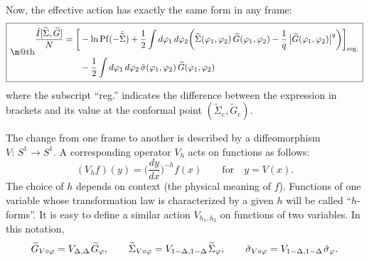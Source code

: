\documentclass[12pt]{article}
\makeatletter
\newcommand*{\wideboxed}[1]{\setlength{\fboxsep}{1ex}%
  \fbox{\m@th$\displaystyle#1$}}
\DeclareMathOperator{\Pf}{Pf}
\newcommand{\cc}{\mathrm{c}}
\newcommand{\tI}{\tilde{I}}
\newcommand{\tG}{\widetilde{G}}
\newcommand{\tSig}{\widetilde{\Sigma}}
\newcommand{\tsig}{\tilde{\sigma}}
\newcommand{\vp}{\varphi}
\makeatother
\begin{document}
Now, the effective action has exactly the same form in any frame:
\begin{equation}\label{rdact1}
\wideboxed{\begin{aligned}
\frac{\tI[\tSig,\tG]}{N}
=\biggl[&-\ln\Pf(-\hat{\tSig})
+\frac{1}{2}\int d\vp_1\,d\vp_2
\biggl(\tSig(\vp_1,\vp_2)\,\tG(\vp_1,\vp_2)
-\frac{1}{q}\,\bigl|\tG(\vp_1,\vp_2)\bigr|^q\biggr)\biggr]_{\text{reg.}}
\\[3pt]
&-\frac{1}{2}\int d\vp_1\,d\vp_2\,
\tsig(\vp_1,\vp_2)\,\tG(\vp_1,\vp_2)
\end{aligned}}
\end{equation}
where the subscript ``reg.'' indicates the difference between the expression in brackets and its value at the conformal point $(\tSig_{\cc},\tG_{\cc})$.

The change from one frame to another is described by a diffeomorphism $V:\,S^1\to S^1$. A corresponding operator $V_{h}$ acts on functions as follows:
\begin{equation}\label{h-form}
(V_{h}f)(y)=\biggl(\frac{dy}{dx}\biggr)^{-h}f(x)\qquad
\text{for}\quad y=V(x).
\end{equation}
The choice of $h$ depends on context (the physical meaning of $f$). Functions of one variable whose transformation law is characterized by a given $h$ will be called ``$h$-forms''. It is easy to define a similar action $V_{h_1,h_2}$ on functions of two variables. In this notation,
\begin{equation}
\tG_{V\circ\vp}=V_{\Delta,\Delta}\kern1pt\tG_{\vp},\qquad
\tSig_{V\circ\vp}=V_{1-\Delta,1-\Delta}\kern1pt\tSig_{\vp},\qquad
\tsig_{V\circ\vp}=V_{1-\Delta,1-\Delta}\kern1pt\tsig_{\vp}.
\end{equation}
\end{document}

